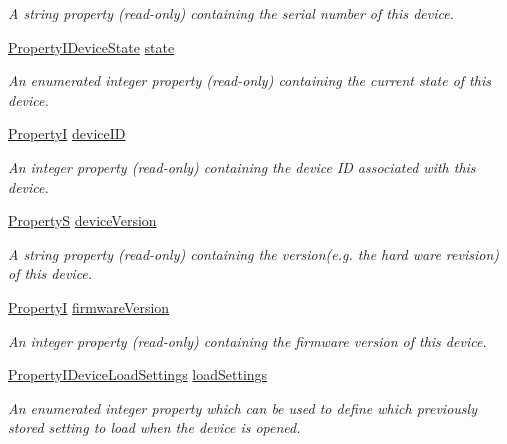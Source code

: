 \begin{DoxyCompactItemize}
\begin{DoxyCompactList}\small\item\em A string property {\bfseries }(read-\/only) containing the serial number of this device. \end{DoxyCompactList}\item 
\hyperlink{group___common_interface_ga1127fb45b2263d328e769e81b1096baf}{Property\+I\+Device\+State} \hyperlink{classmv_i_m_p_a_c_t_1_1acquire_1_1_device_a4861037a845148f813bc72bad7334ebd}{state}
\begin{DoxyCompactList}\small\item\em An enumerated integer property {\bfseries }(read-\/only) containing the current state of this device. \end{DoxyCompactList}\item 
\hyperlink{group___common_interface_ga12d5e434238ca242a1ba4c6c3ea45780}{Property\+I} \hyperlink{classmv_i_m_p_a_c_t_1_1acquire_1_1_device_a239e7c6f214d441015ef15e4cbde83ca}{device\+I\+D}
\begin{DoxyCompactList}\small\item\em An integer property {\bfseries }(read-\/only) containing the device I\+D associated with this device. \end{DoxyCompactList}\item 
\hyperlink{classmv_i_m_p_a_c_t_1_1acquire_1_1_property_s}{Property\+S} \hyperlink{classmv_i_m_p_a_c_t_1_1acquire_1_1_device_a52f3dd5742f14fff0c6fabeae0ccaee1}{device\+Version}
\begin{DoxyCompactList}\small\item\em A string property {\bfseries }(read-\/only) containing the version(e.\+g. the hard ware revision) of this device. \end{DoxyCompactList}\item 
\hyperlink{group___common_interface_ga12d5e434238ca242a1ba4c6c3ea45780}{Property\+I} \hyperlink{classmv_i_m_p_a_c_t_1_1acquire_1_1_device_a74abbd0bc1fda2dce54e28c6076f9528}{firmware\+Version}
\begin{DoxyCompactList}\small\item\em An integer property {\bfseries }(read-\/only) containing the firmware version of this device. \end{DoxyCompactList}\item 
\hyperlink{group___common_interface_ga8af4dfc27c6b4403fb87ad509f67181b}{Property\+I\+Device\+Load\+Settings} \hyperlink{classmv_i_m_p_a_c_t_1_1acquire_1_1_device_ac4bcb8da9f46585ea042a6b3fa618933}{load\+Settings}
\begin{DoxyCompactList}\small\item\em An enumerated integer property which can be used to define which previously stored setting to load when the device is opened. \end{DoxyCompactList}\item 

\end{DoxyCompactItemize}
